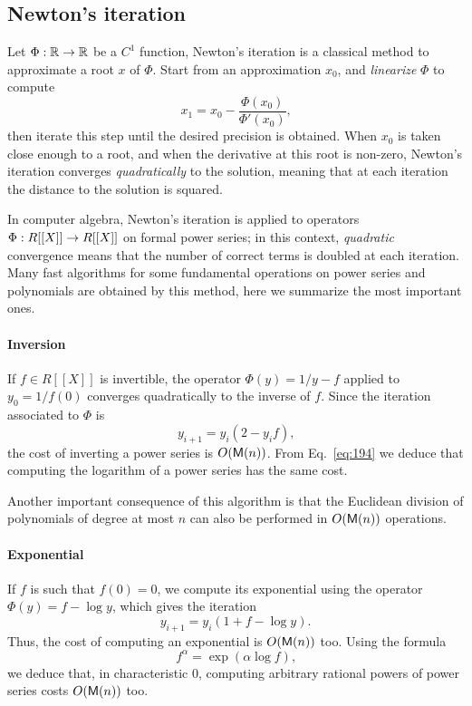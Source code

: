 \subsection{Newton's iteration}
\label{sec:newtons-iteration}
Let $\Phi:\mathbb{R}\rightarrow\mathbb{R}$ be a $C^1$ function,
Newton's iteration is a classical method to
approximate a root $x$ of $\Phi$. Start from an approximation $x_0$,
and \emph{linearize} $\Phi$ to compute
\begin{equation}
  \label{eq:192}
  x_1 = x_0 - \frac{\Phi(x_0)}{\Phi'(x_0)}
  \text{,}
\end{equation}
then iterate this step until the desired precision is obtained. When
$x_0$ is taken close enough to a root, and when the derivative at this
root is non-zero, Newton's iteration converges \emph{quadratically} to
the solution, meaning that at each iteration the distance to the
solution is squared.

In computer algebra, Newton's iteration is applied to operators
$\Phi:R[[X]]\rightarrow R[[X]]$ on formal power series; in this context,
\emph{quadratic} convergence means that the number of correct terms is
doubled at each iteration. Many fast algorithms for some fundamental
operations on power series and polynomials are obtained by this
method, here we summarize the most important ones.

\paragraph{Inversion}
If $f\in R[[X]]$ is invertible, the operator $\Phi(y) = 1/y - f$
applied to $y_0=1/f(0)$ converges quadratically to the inverse of
$f$. Since the iteration associated to $\Phi$ is
\begin{equation}
  \label{eq:193}
  y_{i+1} = y_i(2 - y_if)
  \text{,}
\end{equation}
the cost of inverting a power series is $O(\mathsf{M}(n))$. From
Eq.~\eqref{eq:194} we deduce that computing the logarithm of a power
series has the same cost.

Another important consequence of this algorithm is that the Euclidean
division of polynomials of degree at most $n$ can also be performed in
$O(\mathsf{M}(n))$ operations.

\paragraph{Exponential}
If $f$ is such that $f(0)=0$, we compute its exponential using the
operator $\Phi(y)=f-\log y$, which gives the iteration
\begin{equation}
  \label{eq:196}
  y_{i+1} = y_i(1 + f - \log y)
  \text{.}
\end{equation}
Thus, the cost of computing an exponential is $O(\mathsf{M}(n))$ too. Using
the formula
\begin{equation}
  \label{eq:201}
  f^\alpha = \exp(\alpha\log f)
  \text{,}
\end{equation}
we deduce that, in characteristic $0$, computing arbitrary rational
powers of power series costs $O(\mathsf{M}(n))$ too.


